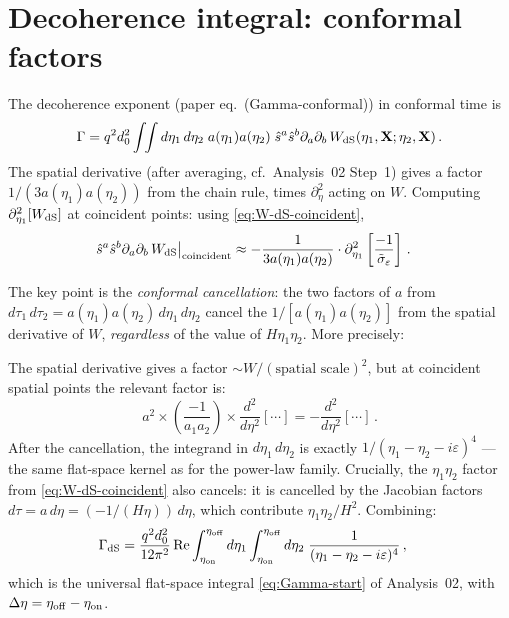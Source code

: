 \documentclass[12pt]{article}
\newcommand{\Scfac}{a}
\newcommand{\Wight}{W}
\newcommand{\pd}{\partial}
\newcommand{\lb}{\left}
\newcommand{\rb}{\right}
\begin{document}
\section*{Decoherence integral: conformal factors}

The decoherence exponent (paper eq.~(Gamma-conformal)) in conformal time is
%
\begin{equation}
  \Gamma
  =
  q^{2}d_{0}^{2}\int\!\!\int d\eta_{1}\,d\eta_{2}\;
  \Scfac(\eta_{1})\Scfac(\eta_{2})\;
  \hat{s}^{a}\hat{s}^{b}\pd_{a}\pd_{b}\,
  \Wight_{\rm dS}(\eta_{1},\mathbf{X};\eta_{2},\mathbf{X}) \,.
\end{equation}
%
The spatial derivative (after averaging, cf.\ Analysis~02 Step~1) gives a factor
$1/(3\Scfac(\eta_{1})\Scfac(\eta_{2}))$ from the chain rule, times $\pd_{\eta}^{2}$
acting on $\Wight$.  Computing $\pd_{\eta_{1}}^{2}[\Wight_{\rm dS}]$ at coincident points:
using \eqref{eq:W-dS-coincident},
%
\begin{align}
  \hat{s}^{a}\hat{s}^{b}\pd_{a}\pd_{b}\,\Wight_{\rm dS}\big|_{\rm coincident}
  &\approx
  -\frac{1}{3\Scfac(\eta_{1})\Scfac(\eta_{2})}
  \cdot\pd_{\eta_{1}}^{2}\lb[\frac{-1}{\tilde\sigma_\varepsilon}\rb] \,.
\end{align}

The key point is the \emph{conformal cancellation}: the two factors of $\Scfac$ from
$d\tau_{1}\,d\tau_{2} = \Scfac(\eta_{1})\Scfac(\eta_{2})\,d\eta_{1}\,d\eta_{2}$
cancel the $1/[\Scfac(\eta_{1})\Scfac(\eta_{2})]$ from the spatial derivative of
$\Wight$, \emph{regardless} of the value of $H\eta_{1}\eta_{2}$.  More precisely:

The spatial derivative gives a factor $\sim \Wight / (\text{spatial scale})^{2}$, but
at coincident spatial points the relevant factor is:
%
\begin{equation}
  \Scfac^{2}\times\lb(\frac{-1}{\Scfac_{1}\Scfac_{2}}\rb)\times\frac{d^{2}}{d\eta^{2}}[\cdots]
  = -\frac{d^{2}}{d\eta^{2}}[\cdots] \,.
\end{equation}
%
After the cancellation, the integrand in $d\eta_{1}\,d\eta_{2}$ is exactly
$1/(\eta_{1}-\eta_{2}-i\varepsilon)^{4}$ — the same flat-space kernel as for the
power-law family.  Crucially, the $\eta_{1}\eta_{2}$ factor from
\eqref{eq:W-dS-coincident} also cancels: it is cancelled by the Jacobian
factors $d\tau = \Scfac\,d\eta = (-1/(H\eta))\,d\eta$, which contribute $\eta_{1}\eta_{2}/H^{2}$.
Combining:
%
\begin{align}
  \Gamma_{\rm dS}
  &=
  \frac{q^{2}d_{0}^{2}}{12\pi^{2}}
  \,\mathrm{Re}\int_{\eta_{\rm on}}^{\eta_{\rm off}}d\eta_{1}
  \int_{\eta_{\rm on}}^{\eta_{\rm off}}d\eta_{2}\;
  \frac{1}{(\eta_{1}-\eta_{2}-i\varepsilon)^{4}} \,,
  \label{eq:Gamma-dS-conformal}
\end{align}
%
which is the universal flat-space integral \eqref{eq:Gamma-start} of Analysis~02,
with $\Delta\eta = \eta_{\rm off}-\eta_{\rm on}$.
\end{document}
